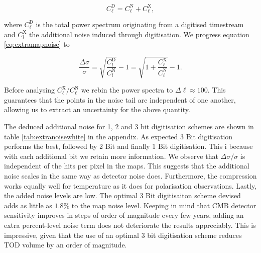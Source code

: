 \documentclass[apj]{emulateapj}
\begin{document}
\begin{equation} C_{\ell}^\mathrm{D} = C_\ell^\mathrm{N} + C_\ell^\mathrm{X}, \end{equation}

where $C_\ell^\mathrm{D}$ is the total power spectrum originating from a digitised timestream and $C_l^\mathrm{X}$ the additional noise induced through digitisation. We progress equation \ref{eq:extramapnoise} to

\begin{equation}\frac{\Delta \sigma}{\sigma} = \sqrt{\frac{C_l^\mathrm{D}}{C_l^{\mathrm{N}}}} - 1 = \sqrt{1 + \frac{C_\ell^\mathrm{X}}{C_\ell^{\mathrm{N}}}} - 1. \end{equation}

Before analysing $C_\ell^\mathrm{X}/C_\ell^\mathrm{N}$ we rebin the power spectra to $\Delta \ell \approx 100$. This guarantees that the points in the noise tail are independent of one another, allowing us to extract an uncertainty for the above quantity.

The deduced additional noise for 1, 2 and 3 bit digitisation schemes are shown in table \ref{tab:extranoisewhite} in the appendix. As expected 3 Bit digitisation performs the best, followed by 2 Bit and finally 1 Bit digitisation. This i because with each additional bit we retain more information. We observe that $\Delta \sigma / \sigma$ is independent of the hits per pixel in the maps. This suggests that the additional noise scales in the same way as detector noise does. Furthermore, the compression works equally well for temperature as it does for polarisation observations. Lastly, the added noise levels are low. The optimal 3 Bit digitisaiton scheme devised adds as little as $1.8\%$ to the map noise level. Keeping in mind that CMB detector sensitivity improves in steps of order of magnitude every few years, adding an extra percent-level noise term does not deteriorate the results appreciably. This is impressive, given that the use of an optimal 3 bit digitisation scheme reduces TOD volume by an order of magnitude.

\end{document}
